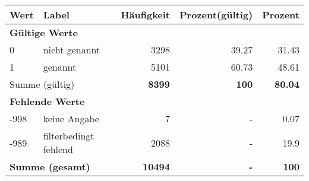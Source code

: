      \begin{longtable}{lXrrr}
     \toprule
     \textbf{Wert} & \textbf{Label} & \textbf{Häufigkeit} & \textbf{Prozent(gültig)} & \textbf{Prozent} \\
     \endhead
     \midrule
     \multicolumn{5}{l}{\textbf{Gültige Werte}}\\

     0 &
     \multicolumn{1}{X}{ nicht genannt   } &


       \num{3298} &
       \num[round-mode=places,round-precision=2]{39,27} &
         \num[round-mode=places,round-precision=2]{31,43} \\

     1 &
     \multicolumn{1}{X}{ genannt   } &


       \num{5101} &
       \num[round-mode=places,round-precision=2]{60,73} &
         \num[round-mode=places,round-precision=2]{48,61} \\
     \midrule
     \multicolumn{2}{l}{Summe (gültig)} &
       \textbf{\num{8399}} &
     \textbf{100} &
       \textbf{\num[round-mode=places,round-precision=2]{80,04}} \\
     \multicolumn{5}{l}{\textbf{Fehlende Werte}}\\
       -998 &
       keine Angabe &
         \num{7} &
        - &
         \num[round-mode=places,round-precision=2]{0,07} \\
       -989 &
       filterbedingt fehlend &
         \num{2088} &
        - &
         \num[round-mode=places,round-precision=2]{19,9} \\
     \midrule
     \multicolumn{2}{l}{\textbf{Summe (gesamt)}} &
          \textbf{\num{10494}} &
        \textbf{-} &
        \textbf{100} \\
     \bottomrule
     \end{longtable}
     
